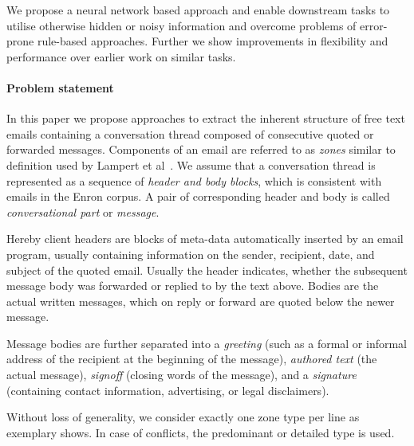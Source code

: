 \documentclass{llncs}
\begin{document}
We propose a neural network based approach and enable downstream tasks to utilise otherwise hidden or noisy information and overcome problems of error-prone rule-based approaches.
Further we show improvements in flexibility and performance over earlier work on similar tasks.









\paragraph{Problem statement}
In this paper we propose approaches to extract the inherent structure of free text emails containing a conversation thread composed of consecutive quoted or forwarded messages.
Components of an email are referred to as \textit{zones} similar to definition used by Lampert et al~\cite{zones}.
We assume that a conversation thread is represented as a sequence of \textit{header and body blocks}, which is consistent with emails in the Enron corpus.
A pair of corresponding header and body is called \textit{conversational part} or \textit{message}.

Hereby client headers are blocks of meta-data automatically inserted by an email program, usually containing information on the sender, recipient, date, and subject of the quoted email.
Usually the header indicates, whether the subsequent message body was forwarded or replied to by the text above.
Bodies are the actual written messages, which on reply or forward are quoted below the newer message.

Message bodies are further separated into a \textit{greeting} (such as a formal or informal address of the recipient at the beginning of the message), \textit{authored text} (the actual message), \textit{signoff} (closing words of the message), and a \textit{signature} (containing contact information, advertising, or legal disclaimers).

Without loss of generality, we consider exactly one zone type per line as  exemplary shows.
In case of conflicts, the predominant or detailed type is used.
\end{document}
